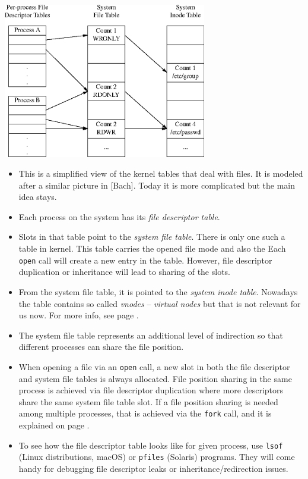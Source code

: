 
\begin{slide}
\begin{center}
%
\includegraphics[width=89mm]{img/eps/open_files1.eps}
\end{center}
\end{slide}

\label{OPENFILETABLES}

\begin{itemize}
\item This is a simplified view of the kernel tables that deal with files.  It
is modeled after a similar picture in [Bach].  Today it is more complicated but
the main idea stays.
\item Each process on the system has its \emph{file descriptor table}.
\item Slots in that table point to the \emph{system file table}.  There is
only one such a table in kernel.  This table carries the opened file mode and
also the  Each \texttt{open} call will create
a new entry in the table. However, file descriptor duplication or inheritance
will lead to sharing of the slots.
\item From the system file table, it is pointed to the \emph{system inode
table}.  Nowadays the table contains so called \emph{vnodes} -- \emph{virtual
nodes} but that is not relevant for us now. For more info,
see page \pageref{VFS}.
\item The system file table represents an additional level of indirection so
that different processes can share the file position.
\item When opening a file via an \texttt{open} call, a new slot in both the file
descriptor and system file tables is always allocated.  File position sharing in
the same process is achieved via file descriptor duplication where more
descriptors share the same system file table slot.  If a file position sharing
is needed among multiple processes, that is achieved via the \texttt{fork}
call, and it is explained on page \pageref{FDSHARING}.
\item To see how the file descriptor table looks like for given process,
use \texttt{lsof} (Linux distributions, macOS) or \texttt{pfiles} (Solaris)
programs. They will come handy for debugging file descriptor leaks or
inheritance/redirection issues.
\end{itemize}

